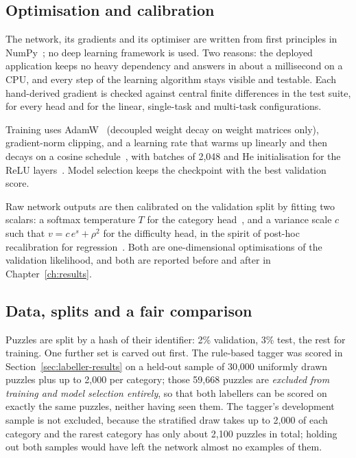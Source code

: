 \subsection{Optimisation and calibration}

The network, its gradients and its optimiser are written from first principles in
NumPy~\cite{harris2020array}; no deep learning framework is used. Two reasons: the deployed
application keeps no heavy dependency and answers in about a millisecond on a CPU, and every step of
the learning algorithm stays visible and testable. Each hand-derived gradient is checked against
central finite differences in the test suite, for every head and for the linear, single-task and
multi-task configurations.

Training uses AdamW~\cite{loshchilov2019decoupled} (decoupled weight decay on weight matrices only),
gradient-norm clipping, and a learning rate that warms up linearly and then decays on a cosine
schedule~\cite{loshchilov2017sgdr}, with batches of 2{,}048 and He initialisation for the ReLU
layers~\cite{he2015delving}. Model selection keeps the checkpoint with the best validation score.

Raw network outputs are then calibrated on the validation split by fitting two scalars: a softmax
temperature $T$ for the category head~\cite{guo2017calibration}, and a variance scale $c$ such that
$v = c\,e^{s} + \rho^2$ for the difficulty head, in the spirit of post-hoc recalibration for
regression~\cite{kuleshov2018accurate}. Both are one-dimensional optimisations of the validation
likelihood, and both are reported before and after in Chapter~\ref{ch:results}.

\subsection{Data, splits and a fair comparison}

Puzzles are split by a hash of their identifier: 2\% validation, 3\% test, the rest for training.
One further set is carved out first. The rule-based tagger was scored in
Section~\ref{sec:labeller-results} on a held-out sample of 30{,}000 uniformly drawn puzzles plus up to
2{,}000 per category; those 59{,}668 puzzles are \emph{excluded from training and model selection
entirely}, so that both labellers can be scored on exactly the same puzzles, neither having seen them.
The tagger's development sample is not excluded, because the stratified draw takes up to 2{,}000 of
each category and the rarest category has only about 2{,}100 puzzles in total; holding out both
samples would have left the network almost no examples of them.

